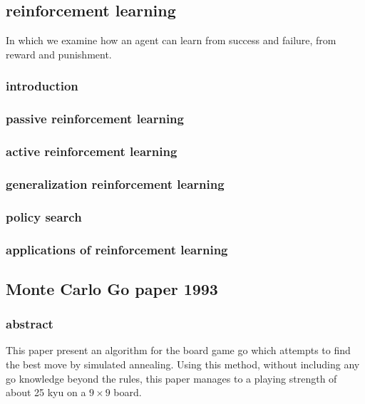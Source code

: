 \subsection{reinforcement learning}
In which we examine how an agent can learn from success and failure, from reward and punishment.
\subsubsection{introduction}
\subsubsection{passive reinforcement learning}
\subsubsection{active reinforcement learning}
\subsubsection{generalization reinforcement learning}
\subsubsection{policy search}
\subsubsection{applications of reinforcement learning}

\subsection{Monte Carlo Go paper 1993}
\subsubsection{abstract}
This paper present an algorithm for the board game go which attempts to find the best move by simulated annealing. Using this method, without including any go knowledge beyond the rules, this paper manages to a playing strength of about 25 kyu on a $9\times9$ board.
